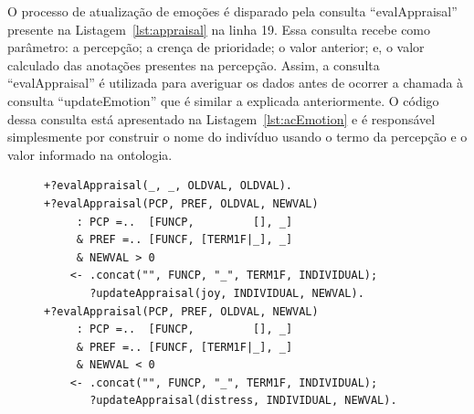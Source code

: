 O processo de atualização de emoções é disparado pela consulta
``evalAppraisal'' presente na Listagem~\ref{lst:appraisal} na linha 19.
Essa consulta recebe como parâmetro: a percepção; a crença de prioridade;
o valor anterior; e, o valor calculado das anotações presentes na percepção.
Assim, a consulta ``evalAppraisal'' é utilizada para averiguar os dados antes
de ocorrer a chamada à consulta ``updateEmotion'' que é similar a explicada
anteriormente. O código dessa consulta está apresentado na
Listagem~\ref{lst:acEmotion} e é responsável simplesmente por construir o
nome do indivíduo usando o termo da percepção e o valor informado na ontologia.

\begin{figure}
\begin{center}
    \begin{minipage}{130mm}
	\lstset{linewidth=130mm}
	\begin{lstlisting}[frame=trbl,
caption=Amostra de código referente à atualização das emoções.,
label=lst:acEmotion]
+?evalAppraisal(_, _, OLDVAL, OLDVAL).
+?evalAppraisal(PCP, PREF, OLDVAL, NEWVAL)
     : PCP =..  [FUNCP,         [], _]
     & PREF =.. [FUNCF, [TERM1F|_], _]
     & NEWVAL > 0
    <- .concat("", FUNCP, "_", TERM1F, INDIVIDUAL);
       ?updateAppraisal(joy, INDIVIDUAL, NEWVAL).
+?evalAppraisal(PCP, PREF, OLDVAL, NEWVAL)
     : PCP =..  [FUNCP,         [], _]
     & PREF =.. [FUNCF, [TERM1F|_], _]
     & NEWVAL < 0
    <- .concat("", FUNCP, "_", TERM1F, INDIVIDUAL);
       ?updateAppraisal(distress, INDIVIDUAL, NEWVAL).
	\end{lstlisting}
    \end{minipage}
\end{center}
\end{figure}

